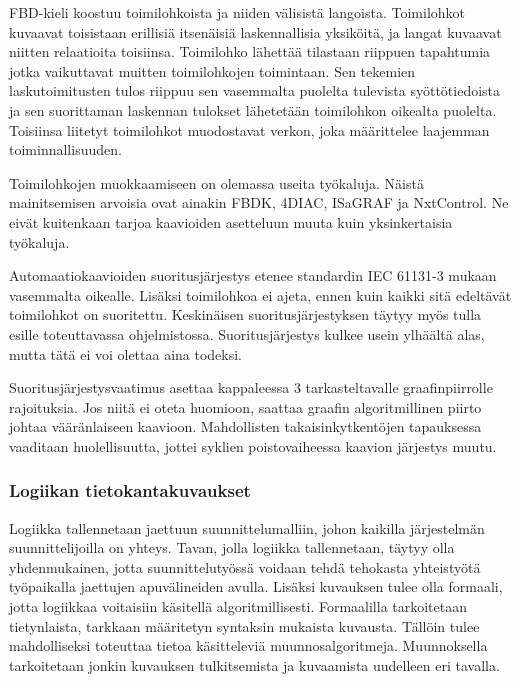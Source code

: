 \documentclass[finnish,12pt]{article}
\begin{document}
FBD-kieli koostuu toimilohkoista ja niiden välisistä langoista.
Toimilohkot kuvaavat toisistaan erillisiä itsenäisiä laskennallisia yksiköitä, ja langat kuvaavat niitten relaatioita toisiinsa.
Toimilohko lähettää tilastaan riippuen tapahtumia jotka vaikuttavat muitten toimilohkojen toimintaan.
Sen tekemien laskutoimitusten tulos riippuu sen vasemmalta puolelta tulevista syöttötiedoista ja sen suorittaman laskennan tulokset lähetetään toimilohkon oikealta puolelta.
Toisiinsa liitetyt toimilohkot muodostavat verkon, joka määrittelee laajemman toiminnallisuuden. \cite{RefWorks:55}

Toimilohkojen muokkaamiseen on olemassa useita työkaluja.
Näistä mainitsemisen arvoisia ovat ainakin FBDK, 4DIAC, ISaGRAF ja NxtControl.
Ne eivät kuitenkaan tarjoa kaavioiden asetteluun muuta kuin yksinkertaisia työkaluja. \cite{RefWorks:35}

Automaatiokaavioiden suoritusjärjestys etenee standardin IEC 61131-3 mukaan vasemmalta oikealle.
Lisäksi toimilohkoa ei ajeta, ennen kuin kaikki sitä edeltävät toimilohkot on suoritettu.
Keskinäisen suoritusjärjestyksen täytyy myös tulla esille toteuttavassa ohjelmistossa.
Suoritusjärjestys kulkee usein ylhäältä alas, mutta tätä ei voi olettaa aina todeksi. \cite{RefWorks:62}

Suoritusjärjestysvaatimus asettaa kappaleessa 3 tarkasteltavalle graafinpiirrolle rajoituksia.
Jos niitä ei oteta huomioon, saattaa graafin algoritmillinen piirto johtaa vääränlaiseen kaavioon.
Mahdollisten takaisinkytkentöjen tapauksessa vaaditaan huolellisuutta, jottei syklien poistovaiheessa kaavion järjestys muutu.


		\subsubsection{Logiikan tietokantakuvaukset}

Logiikka tallennetaan jaettuun suunnittelumalliin, johon kaikilla järjestelmän suunnittelijoilla on yhteys.
Tavan, jolla logiikka tallennetaan, täytyy olla yhdenmukainen, jotta suunnittelutyössä voidaan tehdä tehokasta yhteistyötä työpaikalla jaettujen apuvälineiden avulla.
Lisäksi kuvauksen tulee olla formaali, jotta logiikkaa voitaisiin käsitellä algoritmillisesti.
Formaalilla tarkoitetaan tietynlaista, tarkkaan määritetyn syntaksin mukaista kuvausta.
Tällöin tulee mahdolliseksi toteuttaa tietoa käsitteleviä muunnosalgoritmeja.
Muunnoksella tarkoitetaan jonkin kuvauksen tulkitsemista ja kuvaamista uudelleen eri tavalla.
\end{document}
